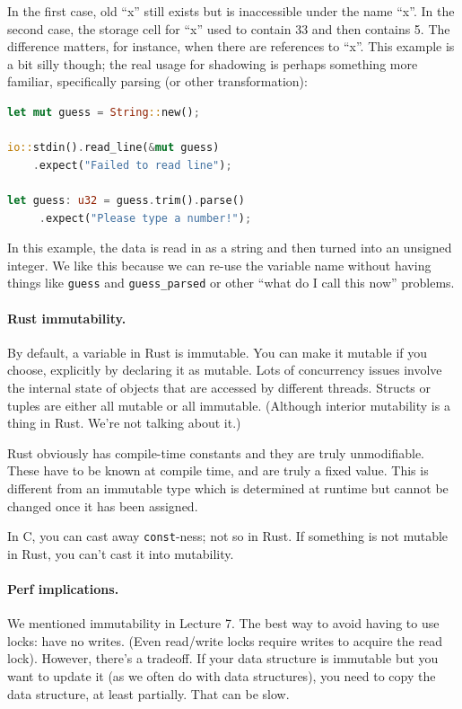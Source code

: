 \documentclass[a4paper]{report}
\begin{document}
In the first case, old ``x'' still exists but is inaccessible under the name ``x''.
In the second case, the storage cell for ``x'' used to contain 33 and then contains 5.
The difference matters, for instance, when there are references to ``x''. This example is a bit silly though; the real usage for shadowing is perhaps something more familiar, specifically parsing (or other transformation): 

\begin{lstlisting}[language=Rust]
let mut guess = String::new();

io::stdin().read_line(&mut guess)
    .expect("Failed to read line");

let guess: u32 = guess.trim().parse()
     .expect("Please type a number!");
\end{lstlisting}

In this example, the data is read in as a string and then turned into an unsigned integer. We like this because we can re-use the variable name without having things like \texttt{guess} and \texttt{guess\_parsed} or other ``what do I call this now'' problems.

\paragraph{Rust immutability.} 
By default, a variable in Rust is immutable. You can make it mutable if you choose, explicitly by declaring it as mutable. Lots of concurrency issues involve the internal state of objects that are accessed by different threads. Structs or tuples are either all mutable or all immutable. (Although interior mutability is a thing in Rust. We're not talking about it.)

Rust obviously has compile-time constants and they are truly unmodifiable. These have to be known at compile time, and are truly a fixed value. This is different from an immutable type which is determined at runtime but cannot be changed once it has been assigned.

In C, you can cast away {\tt const}-ness; not so in Rust.
If something is not mutable in Rust, you can't cast it into mutability.


\paragraph{Perf implications.}
We mentioned immutability in Lecture 7. The best way to avoid having
to use locks: have no writes. (Even read/write locks require writes to acquire
the read lock). However, there's a tradeoff. If your
data structure is immutable but you want to update it (as we often do
with data structures), you need to copy the data structure, at least
partially. That can be slow.
\end{document}
